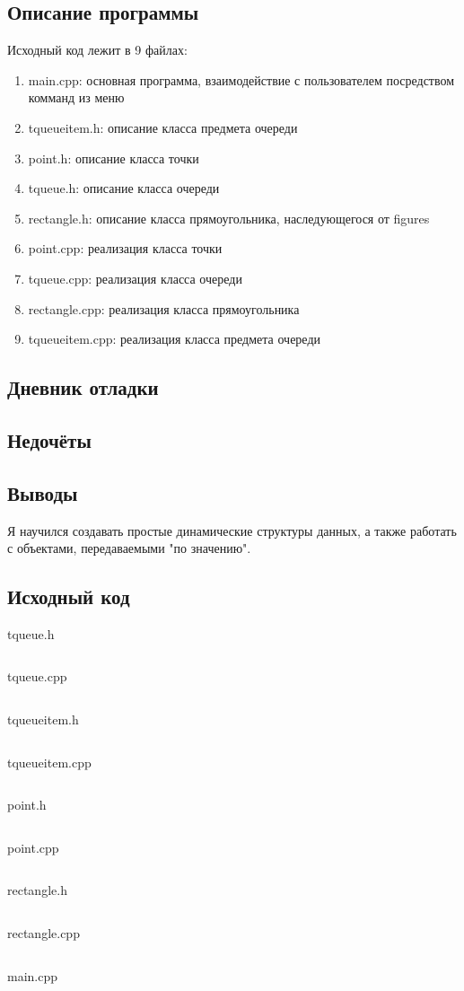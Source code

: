 \documentclass[12pt]{article}
\begin{document}
\subsection*{Описание программы}

Исходный код лежит в 9 файлах:
\begin{enumerate}
\item main.cpp: основная программа, взаимодействие с пользователем посредством комманд из меню

\item tqueueitem.h:    описание класса предмета очереди
\item point.h:     описание класса точки
\item tqueue.h:  описание класса очереди
\item rectangle.h: описание класса прямоугольника, наследующегося от figures
\item point.cpp:     реализация класса точки
\item tqueue.cpp:  реализация класса очереди
\item rectangle.cpp: реализация класса прямоугольника
\item tqueueitem.cpp:    реализация класса предмета очереди

\end{enumerate}

\subsection*{Дневник отладки}


\subsection*{Недочёты}


\subsection*{Выводы}

Я научился создавать простые динамические структуры данных, а также работать с объектами, передаваемыми "по значению".


\vfill

\subsection*{Исходный код}

{\Huge tqueue.h}
\inputminted{C++}{tqueue.h}
    \pagebreak

{\Huge tqueue.cpp}
\inputminted{C++}{tqueue.cpp}
\pagebreak

{\Huge tqueueitem.h}
\inputminted{C++}{tqueueitem.h}
\pagebreak

{\Huge tqueueitem.cpp}
\inputminted{C++}{tqueueitem.cpp}
\pagebreak
    
{\Huge point.h}
\inputminted{C++}{point.h}
    \pagebreak

{\Huge point.cpp}
\inputminted{C++}{point.cpp}
    \pagebreak

{\Huge rectangle.h}
\inputminted{C++}{rectangle.h}
\pagebreak

{\Huge rectangle.cpp}
\inputminted{C++}{rectangle.cpp}
\pagebreak
    
{\Huge main.cpp}
\inputminted{C++}{main.cpp}
    \pagebreak
    
\end{document}
